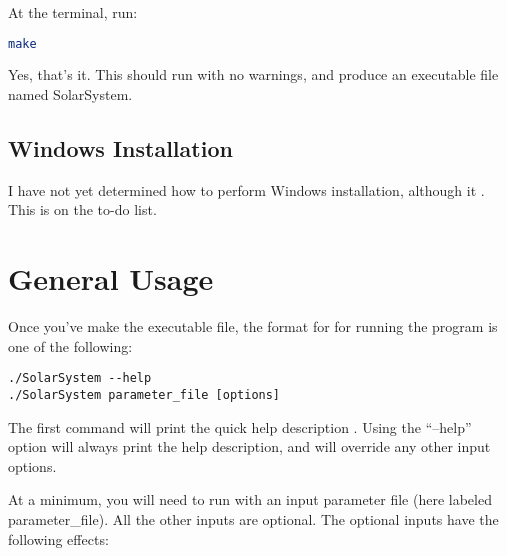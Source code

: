 \documentclass{article}
\begin{document}
At the terminal, run:

\begin{lstlisting}[language=bash]
make
\end{lstlisting}

Yes, that's it.  This should run with no warnings, and produce an executable file named SolarSystem.

\subsection{Windows Installation}

I have not yet determined how to perform Windows installation, although it .  This is on the to-do list.

\section{General Usage}

Once you've make the executable file, the format for for running the program is one of the following:

\begin{lstlisting}
./SolarSystem --help
./SolarSystem parameter_file [options]
\end{lstlisting}

The first command will print the quick help description .  Using the ``--help'' option will always print the help description, and will override any other input options.

At a minimum, you will need to run with an input parameter file (here labeled parameter\_file).  All the other inputs are optional.  The optional inputs have the following effects:
\end{document}
